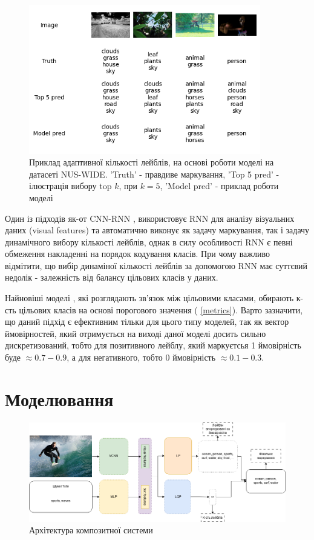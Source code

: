 \documentclass{udstu}
\begin{document}
\begin{figure}[!ht]
	\centering
	\includegraphics[width=0.9\textwidth]{PNG/test-topk-144}
	\caption{
	Приклад адаптивної кількості лейблів,
	на основі роботи моделі на датасеті NUS-WIDE.
	'Truth' - правдиве маркування,
	'Top 5 pred' - ілюстрація вибору top $k$, при $k=5$,
	'Model pred' - приклад роботи моделі
	}
	\label{figure:test-topk}
\end{figure}

Один із підходів як-от CNN-RNN \cite{cnn-rnn},
використовує RNN для аналізу візуальних даних (visual features) та автоматично виконує як задачу маркування,
так і задачу динамічного вибору кількості лейблів, однак в силу особливості RNN є певні обмеження
накладенні на порядок кодування класів. При чому важливо відмітити, що вибір динаміної кількості лейблів
за допомогою RNN має суттєвий недолік - залежність від балансу цільових класів у даних.

Найновіші моделі \cite{q2l, cpsd, cma}, які розглядають зв'язок між цільовими класами, обирають
к-сть цільових класів на основі порогового значення (\chaptername{ \ref{metrics}}). Варто зазначити, що
даний підхід є ефективним тільки для цього типу моделей, так як вектор ймовірностей, який отримується на виході
даної моделі досить сильно дискретизований,
тобто для позитивного лейблу, який маркуєтсья 1 ймовірність буде $\approx 0.7-0.9$,
а для негативного, тобто 0 ймовірність $\approx 0.1-0.3$.


\chapter{Моделювання}

\begin{figure}[!ht]
	\centering
	\includegraphics[width=1.0\textwidth]{PNG/composite}
	\caption{Архітектура композитної системи}
	\label{figure:composite}
\end{figure}
\end{document}
